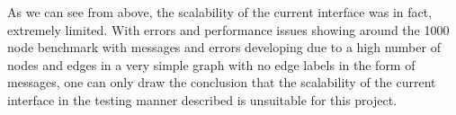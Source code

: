 As we can see from above, the scalability of the current interface was in fact,
extremely limited. With errors and performance issues showing around the 1000
node benchmark with messages and errors developing due to a high number of nodes
and edges in a very simple graph with no edge labels in the form of messages,
one can only draw the conclusion that the scalability of the current interface
in the testing manner described is unsuitable for this project.